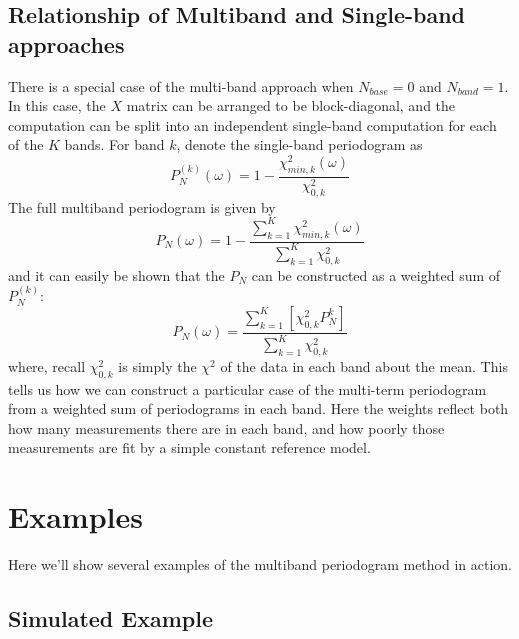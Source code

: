 \documentclass[12pt,preprint]{aastex}
\newcommand{\sectlabel}[1]{\label{sect:#1}}
\begin{document}
\subsection{Relationship of Multiband and Single-band approaches}
There is a special case of the multi-band approach when $N_{base}=0$ and $N_{band}=1$. In this case, the $X$ matrix can be arranged to be block-diagonal, and the computation can be split into an independent single-band computation for each of the $K$ bands. For band $k$, denote the single-band periodogram as
\begin{equation}
  P_N^{(k)}(\omega) = 1 - \frac{\chi^2_{min, k}(\omega)}{\chi^2_{0,k}}
\end{equation}
The full multiband periodogram is given by
\begin{equation}
  P_N(\omega) = 1 - \frac{\sum_{k=1}^K\chi^2_{min, k}(\omega)}{\sum_{k=1}^K\chi^2_{0,k}}
\end{equation}
and it can easily be shown that the $P_N$ can be constructed as a weighted sum of $P_N^{(k)}$:
\begin{equation}
  P_N(\omega) = \frac{\sum_{k=1}^K\left[\chi^2_{0,k}P_N^{k}\right]}{\sum_{k=1}^K\chi^2_{0,k}}
\end{equation}
where, recall $\chi^2_{0,k}$ is simply the $\chi^2$ of the data in each band about the mean. This tells us how we can construct a particular case of the multi-term periodogram from a weighted sum of periodograms in each band. Here the weights reflect both how many measurements there are in each band, and how poorly those measurements are fit by a simple constant reference model.

\section{Examples}
Here we'll show several examples of the multiband periodogram method in action.

\subsection{Simulated Example}
\sectlabel{Simulated}
\end{document}
